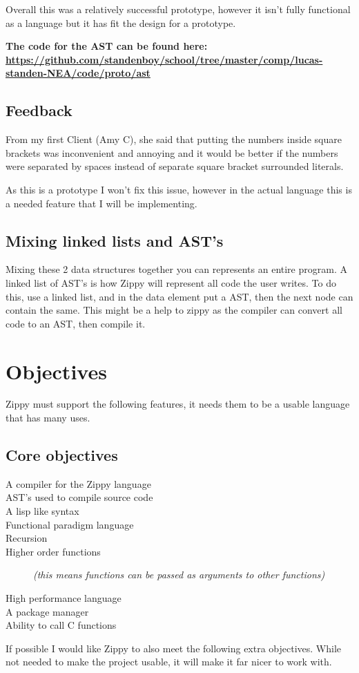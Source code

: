 \documentclass[a4paper,12pt]{article}
\begin{document}
{Overall this was a relatively successful prototype, however it isn't fully functional 
as a language but it has fit the design for a prototype.

\textbf{The code for the AST can be found here:
\url{https://github.com/standenboy/school/tree/master/comp/lucas-standen-NEA/code/proto/ast}}

\subsection{Feedback}
From my first Client (Amy C), she said that putting the numbers inside square brackets 
was inconvenient and annoying and it would be better if the numbers were separated
by spaces instead of separate square bracket surrounded literals.

As this is a prototype I won't fix this issue, however in the actual language this is 
a needed feature that I will be implementing.

\subsection{Mixing linked lists and AST's}
Mixing these 2 data structures together you can represents an entire program. A linked 
list of AST's is how Zippy will represent all code the user writes. To do this, use a 
linked list, and in the data element put a AST, then the next node can contain the same. 
This might be a help to zippy as the compiler can convert all code to an AST, then 
compile it.
\section{Objectives}
Zippy must support the following features, it needs them to be a usable language that has 
many uses.
\subsection{Core objectives}
\begin{description}
	\item[A compiler for the Zippy language]
	\item[AST's used to compile source code]
	\item[A lisp like syntax]
	\item[Functional paradigm language]
	\item[Recursion]
	\item[Higher order functions] \textit{(this means functions can be passed as arguments to 
		other functions)}
	\item[High performance language]
	\item[A package manager]
	\item[Ability to call C functions]
\end{description}
If possible I would like Zippy to also meet the following extra objectives. While not needed to make the project
usable, it will make it far nicer to work with.
}
\end{document}
